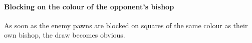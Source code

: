 
\paragraph{Blocking on the colour of the opponent's bishop}\label{block-on-bishop-colour}
As soon as the enemy pawns are blocked on squares of the same colour as their own bishop, the draw
becomes obvious.
